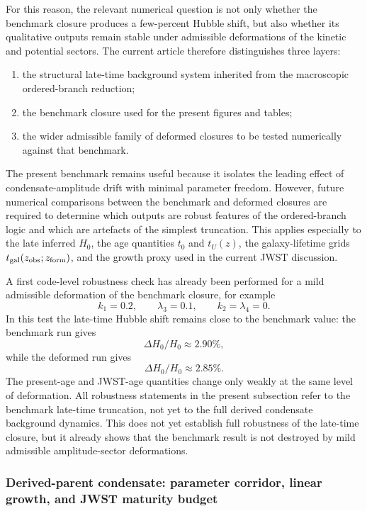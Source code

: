 \documentclass[11pt,a4paper]{article}
\numberwithin{equation}{section}
\begin{document}
For this reason, the relevant numerical question is not only whether the
benchmark closure produces a few-percent Hubble shift, but also whether
its qualitative outputs remain stable under admissible deformations of
the kinetic and potential sectors.
The current article therefore distinguishes three layers:

\begin{enumerate}
  \item the structural late-time background system inherited from the
  macroscopic ordered-branch reduction;
  \item the benchmark closure used for the present figures and tables;
  \item the wider admissible family of deformed closures to be tested
  numerically against that benchmark.
\end{enumerate}

The present benchmark remains useful because it isolates the leading
effect of condensate-amplitude drift with minimal parameter freedom.
However, future numerical comparisons between the benchmark and deformed
closures are required to determine which outputs are robust features of
the ordered-branch logic and which are artefacts of the simplest
truncation.
This applies especially to the late inferred $H_0$, the age quantities
$t_0$ and $t_U(z)$, the galaxy-lifetime grids
$t_{\rm gal}(z_{\rm obs};z_{\rm form})$, and the growth proxy used in
the current JWST discussion.

A first code-level robustness check has already been performed for a
mild admissible deformation of the benchmark closure, for example
\[
k_1=0.2,\qquad \lambda_3=0.1,
\qquad k_2=\lambda_4=0.
\]
In this test the late-time Hubble shift remains close to the benchmark
value:
the benchmark run gives
\[
\Delta H_0/H_0 \approx 2.90\%,
\]
while the deformed run gives
\[
\Delta H_0/H_0 \approx 2.85\%.
\]
The present-age and JWST-age quantities change only weakly at the same
level of deformation.
All robustness statements in the present subsection refer to the
benchmark late-time truncation, not yet to the full derived condensate
background dynamics.
This does not yet establish full robustness of the late-time closure,
but it already shows that the benchmark result is not destroyed by mild
admissible amplitude-sector deformations.

\subsubsection*{Derived-parent condensate: parameter corridor, linear growth, and JWST maturity budget}
\label{sec:derived_parent_jwst_main}
\end{document}
